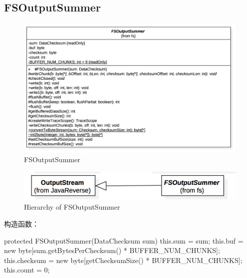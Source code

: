 \subsection{FSOutputSummer}

\begin{figure}
\centering
\includegraphics[width =1\linewidth]{uml/outputstream/4.png}
\caption{FSOutputSummer}
\label{fig:FSOutputSummer}
\end{figure}

\begin{figure}
\centering
\includegraphics[width =1\linewidth]{uml/outputstream/5.png}
\caption{Hierarchy of FSOutputSummer}
\label{fig:Hierarchy of FSOutputSummer}
\end{figure}

构造函数：
\begin{java}
protected FSOutputSummer(DataChecksum sum) {
  this.sum = sum;
  this.buf = new byte[sum.getBytesPerChecksum() * BUFFER_NUM_CHUNKS];
  this.checksum = new byte[getChecksumSize() * BUFFER_NUM_CHUNKS];
  this.count = 0;
}
\end{java}

\endinput
